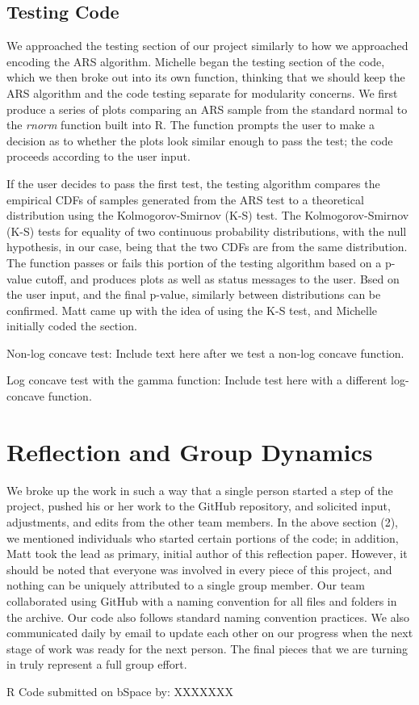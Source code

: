 \documentclass{article}
\begin{document}
\subsection{Testing Code}
We approached the testing section of our project similarly to how we approached encoding the ARS algorithm.  Michelle began the testing section of the code, which we then broke out into its own function, thinking that we should keep the ARS algorithm and the code testing separate for modularity concerns.  We first produce a series of plots comparing an ARS sample from the standard normal to the \textit{rnorm} function built into R.  The function prompts the user to make a decision as to whether the plots look similar enough to pass the test; the code proceeds according to the user input.

If the user decides to pass the first test, the testing algorithm compares the empirical CDFs of samples generated from the ARS test to a theoretical distribution using the Kolmogorov-Smirnov (K-S) test.  The Kolmogorov-Smirnov (K-S) tests for equality of two continuous probability distributions, with the null hypothesis, in our case, being that the two CDFs are from the same distribution. The function passes or fails this portion of the testing algorithm based on a p-value cutoff, and produces plots as well as status messages to the user.  Bsed on the user input, and the final p-value, similarly between distributions can be confirmed. Matt came up with the idea of using the K-S test, and Michelle initially coded the section.

Non-log concave test: Include text here after we test a non-log concave function. 

Log concave test with the gamma function: Include test here with a different log-concave function. 

\section{Reflection and Group Dynamics}
We broke up the work in such a way that a single person started a step of the project, pushed his or her work to the GitHub repository, and solicited input, adjustments, and edits from the other team members.  In the above section (2), we mentioned individuals who started certain portions of the code; in addition, Matt took the lead as primary, initial author of this reflection paper.  However, it should be noted that everyone was involved in every piece of this project, and nothing can be uniquely attributed to a single group member.  Our team collaborated using GitHub with a naming convention for all files and folders in the archive. Our code also follows standard naming convention practices. We also communicated daily by email to update each other on our progress when the next stage of work was ready for the next person. The final pieces that we are turning in truly represent a full group effort. 

R Code submitted on bSpace by: XXXXXXX
\end{document}

